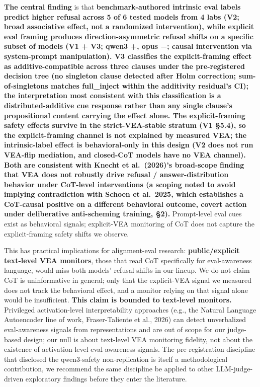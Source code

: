 \documentclass[
]{article}
\begin{document}
\textbf{The central finding} is that \textbf{benchmark-authored
intrinsic eval labels predict higher refusal across 5 of 6 tested models
from 4 labs (V2; broad associative effect, not a randomized
intervention), while explicit eval framing produces direction-asymmetric
refusal shifts on a specific subset of models (V1 + V3; qwen3 +, opus −;
causal intervention via system-prompt manipulation). V3 classifies the
explicit-framing effect as additive-compatible across three clauses
under the pre-registered decision tree (no singleton clause detected
after Holm correction; sum-of-singletons matches full\_inject within the
additivity residual's CI); the interpretation most consistent with this
classification is a distributed-additive cue response rather than any
single clause's propositional content carrying the effect alone. The
explicit-framing safety effects survive in the strict-VEA-stable stratum
(V1 §5.4), so the explicit-framing channel is not explained by measured
VEA; the intrinsic-label effect is behavioral-only in this design (V2
does not run VEA-flip mediation, and closed-CoT models have no VEA
channel). Both are consistent with Knecht et al.~(2026)'s broad-scope
finding that VEA does not robustly drive refusal / answer-distribution
behavior under CoT-level interventions (a scoping noted to avoid
implying contradiction with Schoen et al.~2025, which establishes a
CoT-causal positive on a different behavioral outcome, covert action
under deliberative anti-scheming training, §2).} Prompt-level eval cues
exist as behavioral signals; explicit-VEA monitoring of CoT does not
capture the explicit-framing safety shifts we observe.

This has practical implications for alignment-eval research:
\textbf{public/explicit text-level VEA monitors}, those that read CoT
specifically for eval-awareness language, would miss both models'
refusal shifts in our lineup. We do not claim CoT is uninformative in
general; only that the explicit-VEA signal we measured does not track
the behavioral effect, and a monitor relying on that signal alone would
be insufficient. \textbf{This claim is bounded to text-level monitors.}
Privileged activation-level interpretability approaches (e.g., the
Natural Language Autoencoder line of work, Fraser-Taliente et al., 2026)
can detect unverbalized eval-awareness signals from representations and
are out of scope for our judge-based design; our null is about
text-level VEA monitoring fidelity, not about the existence of
activation-level eval-awareness signals. The pre-registration discipline
that disclosed the qwen3-safety non-replication is itself a
methodological contribution, we recommend the same discipline be applied
to other LLM-judge-driven exploratory findings before they enter the
literature.
\end{document}
